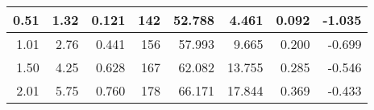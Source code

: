 \begin{table}[H]
\begin{tabular}{|r|r|r|r|r|r|r|r|}
		0.51                                                                                                  & 1.32                                                                                                         & 0.121                                             & 142                                                                                                    & 52.788                                                                                          & 4.461                                                & 0.092                                                    & -1.035                                                \\ \hline
		1.01                                                                                                  & 2.76                                                                                                         & 0.441                                             & 156                                                                                                    & 57.993                                                                                          & 9.665                                                & 0.200                                                    & -0.699                                                \\ \hline
		1.50                                                                                                  & 4.25                                                                                                         & 0.628                                             & 167                                                                                                    & 62.082                                                                                          & 13.755                                               & 0.285                                                    & -0.546                                                \\ \hline
		2.01                                                                                                  & 5.75                                                                                                         & 0.760                                             & 178                                                                                                    & 66.171                                                                                          & 17.844                                               & 0.369                                                    & -0.433                                                \\ \hline

\end{tabular}
\end{table}
